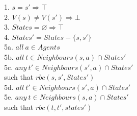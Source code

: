 
1. \indent $s = s' \Rightarrow \top$ \\
2.	\indent $V(s) \neq V(s') \Rightarrow \bot$ \\
3.	\indent $States = \varnothing \Rightarrow \top$ \\
4. \indent $States' = States - \{s, s'\}$ \\
5a. \indent $all \ a \in Agents $ \\
5b. \indent\indent $all \ t \in Neighbours(s,a) \cap States'$ \\
5c. \indent\indent\indent $any \ t' \in Neighbours(s',a) \cap States'$ \\
	  \indent\indent\indent\indent  such that $rbc(s, s', States')$ \\
5d.  \indent\indent $all \ t' \in Neighbours(s',a) \cap States'$ \\
5e.  \indent\indent\indent $any \ t \in Neighbours(s,a) \cap States'$ \\
       \indent\indent\indent\indent such that $rbc(t, t', states')$ \\
\\